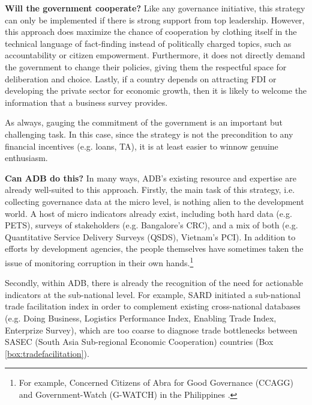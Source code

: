 \documentclass[12pt]{article}
\begin{document}
\textbf{Will the government cooperate?} Like any governance initiative, this strategy can only be implemented if there is strong support from top leadership. However, this approach does maximize the chance of cooperation by clothing itself in the technical language of fact-finding instead of politically charged topics, such as accountability or citizen empowerment. Furthermore, it does not directly demand the government to change their policies, giving them the respectful space for deliberation and choice. Lastly, if a country depends on attracting FDI or developing the private sector for economic growth, then it is likely to welcome the information that a business survey provides.

As always, gauging the commitment of the government is an important but challenging task. In this case, since the strategy is not the precondition to any financial incentives (e.g. loans, TA), it is at least easier to winnow genuine enthusiasm.

\textbf{Can ADB do this?} In many ways, ADB's existing resource and expertise are already well-suited to this approach. Firstly, the main task of this strategy, i.e. collecting governance data at the micro level, is nothing alien to the development world. A host of micro indicators already exist, including both hard data (e.g. PETS), surveys of stakeholders (e.g. Bangalore's CRC), and a mix of both (e.g. Quantitative Service Delivery Surveys (QSDS), Vietnam's PCI). In addition to efforts by development agencies, the people themselves have sometimes taken the issue of monitoring corruption in their own hands.\footnote{For example, Concerned Citizens of Abra for Good Governance (CCAGG) and Government-Watch (G-WATCH) in the Philippines \citep{ProcurementWatch2008}.}

Secondly, within ADB, there is already the recognition of the need for actionable indicators at the sub-national level. For example, SARD initiated a sub-national trade facilitation index in order to complement existing cross-national databases (e.g. Doing Business, Logistics Performance Index, Enabling Trade Index, Enterprize Survey), which are too coarse to diagnose trade bottlenecks between SASEC (South Asia Sub-regional Economic Cooperation) countries (Box \ref{box:tradefacilitation}).
\end{document}
